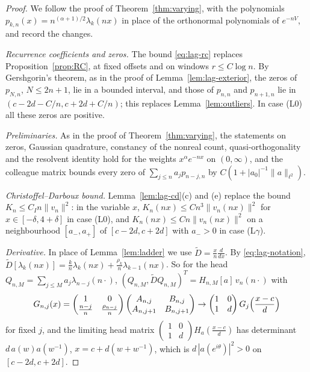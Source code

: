 \documentclass[11pt]{amsart}
\theoremstyle{definition}
\theoremstyle{remark}
\numberwithin{equation}{section}
\begin{document}
\begin{proof}
We follow the proof of Theorem~\ref{thm:varying}, with the polynomials $p_{k,n}(x)=n^{(\alpha+1)/2}\lambda_k(nx)$ in place of the orthonormal polynomials of $e^{-nV}$, and record the changes.

\emph{Recurrence coefficients and zeros.} The bound \eqref{eq:lag-rc} replaces Proposition~\ref{prop:RC}, at fixed offsets and on windows $r\le C\log n$. By Gershgorin's theorem, as in the proof of Lemma~\ref{lem:lag-exterior}, the zeros of $p_{N,n}$, $N\le2n+1$, lie in a bounded interval, and those of $p_{n,n}$ and $p_{n+1,n}$ lie in $(c-2d-C/n,c+2d+C/n)$; this replaces Lemma~\ref{lem:outliers}. In case (L0) all these zeros are positive.

\emph{Preliminaries.} As in the proof of Theorem~\ref{thm:varying}, the statements on zeros, Gaussian quadrature, constancy of the nonreal count, quasi-orthogonality and the resolvent identity \cite[Lemmas~{\ref{M-lem:zeros}}, {\ref{M-lem:quadrature}}, {\ref{M-lem:constancy}}, {\ref{M-lem:quasi}} and~{\ref{M-lem:resolvent}}]{Main} hold for the weights $x^\alpha e^{-nx}$ on $(0,\infty)$, and the colleague matrix \cite[Lemma~\ref{M-lem:colleague}]{Main} bounds every zero of $\sum_{j\le n}a_jp_{n-j,n}$ by $C(1+|a_0|^{-1}\|a\|_{\ell^2})$.

\emph{Christoffel--Darboux bound.} Lemma~\ref{lem:lag-cd}(c) and (e) replace the bound $K_n\le C_In\|v_n\|^2$: in the variable $x$, $K_n(nx)\le Cn^3\|v_n(nx)\|^2$ for $x\in[-\delta,4+\delta]$ in case (L0), and $K_n(nx)\le Cn\|v_n(nx)\|^2$ on a neighbourhood $[a_-,a_+]$ of $[c-2d,c+2d]$ with $a_->0$ in case (L$\gamma$).

\emph{Derivative.} In place of Lemma~\ref{lem:ladder} we use $\widetilde D=\frac xn\frac d{dx}$. By \eqref{eq:lag-notation}, $\widetilde D[\lambda_k(nx)]=\frac kn\lambda_k(nx)+\frac{\rho_k}n\lambda_{k-1}(nx)$. So for the head $Q_{n,M}=\sum_{j\le M}a_j\lambda_{n-j}(n\cdot)$, $(Q_{n,M},\widetilde DQ_{n,M})^T=H_{n,M}[a]\,v_n(n\cdot)$ with
\[
G_{n,j}(x)=\begin{pmatrix}1&0\\ \frac{n-j}n&\frac{\rho_{n-j}}n\end{pmatrix}\begin{pmatrix}A_{n,j}&B_{n,j}\\A_{n,j+1}&B_{n,j+1}\end{pmatrix}\to\begin{pmatrix}1&0\\1&d\end{pmatrix}G_j\Bigl(\frac{x-c}d\Bigr)
\]
for fixed $j$, and the limiting head matrix $\begin{pmatrix}1&0\\1&d\end{pmatrix}H_a(\frac{x-c}d)$ has determinant $d\,a(w)a(w^{-1})$, $x=c+d(w+w^{-1})$, which is $d\,|a(e^{i\theta})|^2>0$ on $[c-2d,c+2d]$.


\end{proof}
\end{document}
